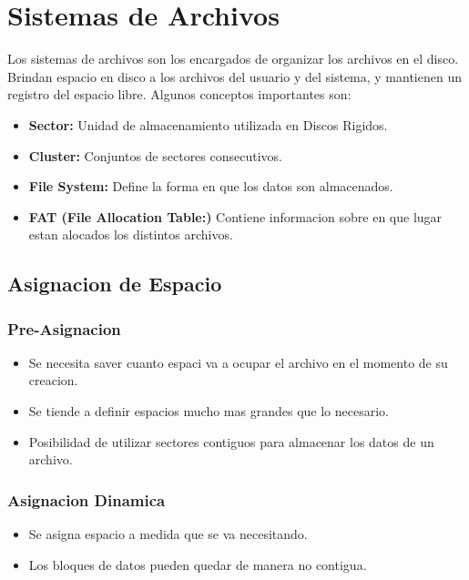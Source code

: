 \documentclass[12pt]{article}
\begin{document}
\section{Sistemas de Archivos}
Los sistemas de archivos son los encargados de organizar los archivos en el disco. Brindan espacio en disco a los archivos del usuario y del sistema, y mantienen un registro del espacio libre.
Algunos conceptos importantes son:
\begin{itemize}
    \item \textbf{Sector:} Unidad de almacenamiento utilizada en Discos Rigidos.
    \item \textbf{Cluster:} Conjuntos de sectores consecutivos.
    \item \textbf{File System:} Define la forma en que los datos son almacenados.
    \item \textbf{FAT (File Allocation Table:)} Contiene informacion sobre en que lugar estan alocados los distintos archivos.
\end{itemize}

\subsection{Asignacion de Espacio}
\subsubsection{Pre-Asignacion}
\begin{itemize}
    \item Se necesita saver cuanto espaci va a ocupar el archivo en el momento de su creacion.
    \item Se tiende a definir espacios mucho mas grandes que lo necesario.
    \item Posibilidad de utilizar sectores contiguos para almacenar los datos de un archivo.
\end{itemize}
\subsubsection{Asignacion Dinamica}
\begin{itemize}
    \item Se asigna espacio a medida que se va necesitando.
    \item Los bloques de datos pueden quedar de manera no contigua.
\end{itemize}
\end{document}
